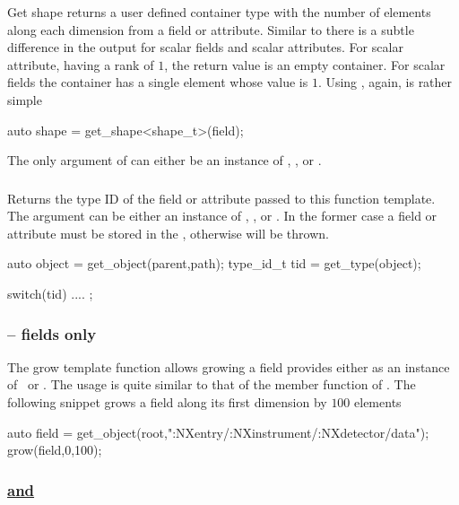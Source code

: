 Get shape returns a user defined container type with the number of elements
along each dimension from a field or attribute. Similar to 
there is a subtle difference in the output for scalar fields and scalar
attributes. For scalar attribute, having a rank of $1$, the return value is 
an empty container. For scalar fields the container has a single element whose
value is $1$. 
Using , again, is rather simple
\begin{cppcode}
auto shape = get_shape<shape_t>(field);
\end{cppcode}
The only argument of  can either be an instance of \nxfield, 
 \nxattribute, or \nxobject.

\subsubsection{}

Returns the type ID of the field or attribute passed to this function template. 
The argument can be either an instance of \nxobject, \nxfield, or \nxattribute.
In the former case a field or attribute must be stored in the \nxobject, 
otherwise  will be thrown. 
\begin{cppcode}
auto object = get_object(parent,path);
type_id_t tid = get_type(object);

switch(tid)
{
    ....
};
\end{cppcode}


\subsubsection{-- fields only}

The grow template function allows growing a field provides either as an instance
of \nxfield\ or \nxobject. The usage is quite similar to that of the 
member function of \nxfield. The following snippet grows a field along its first
dimension by $100$ elements
\begin{cppcode}
auto field = get_object(root,":NXentry/:NXinstrument/:NXdetector/data");
grow(field,0,100);
\end{cppcode}

\subsubsection{\underline{ \textrm{and} }}

